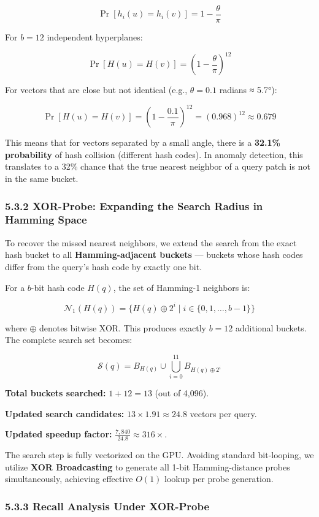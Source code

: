 \documentclass[12pt, a4paper, oneside]{report}
\begin{document}
\[\Pr[h_i(u) = h_i(v)] = 1 - \frac{\theta}{\pi}\]

For \(b = 12\) independent hyperplanes:

\[\Pr[H(u) = H(v)] = \left(1 - \frac{\theta}{\pi}\right)^{12}\]

For vectors that are close but not identical (e.g., \(\theta = 0.1\) radians ≈ 5.7°):

\[\Pr[H(u) = H(v)] = \left(1 - \frac{0.1}{\pi}\right)^{12} = (0.968)^{12} \approx 0.679\]

This means that for vectors separated by a small angle, there is a \textbf{32.1\% probability} of hash collision (different hash codes). In anomaly detection, this translates to a 32\% chance that the true nearest neighbor of a query patch is not in the same bucket.

\subsubsection{5.3.2 XOR-Probe: Expanding the Search Radius in Hamming Space}\label{xor-probe-expanding-the-search-radius-in-hamming-space}

To recover the missed nearest neighbors, we extend the search from the exact hash bucket to all \textbf{Hamming-adjacent buckets} --- buckets whose hash codes differ from the query's hash code by exactly one bit.

For a \(b\)-bit hash code \(H(q)\), the set of Hamming-1 neighbors is:

\[\mathcal{N}_1(H(q)) = \{H(q) \oplus 2^i \mid i \in \{0, 1, \ldots, b-1\}\}\]

where \(\oplus\) denotes bitwise XOR. This produces exactly \(b = 12\) additional buckets. The complete search set becomes:

\[\mathcal{S}(q) = B_{H(q)} \cup \bigcup_{i=0}^{11} B_{H(q) \oplus 2^i}\]

\textbf{Total buckets searched:} \(1 + 12 = 13\) (out of 4,096).

\textbf{Updated search candidates:} \(13 \times 1.91 \approx 24.8\) vectors per query.

\textbf{Updated speedup factor:} \(\frac{7{,}840}{24.8} \approx 316\times\).

The search step is fully vectorized on the GPU. Avoiding standard bit-looping, we utilize \textbf{XOR Broadcasting} to generate all 1-bit Hamming-distance probes simultaneously, achieving effective \(O(1)\) lookup per probe generation.

\subsubsection{5.3.3 Recall Analysis Under XOR-Probe}\label{recall-analysis-under-xor-probe}
\end{document}
